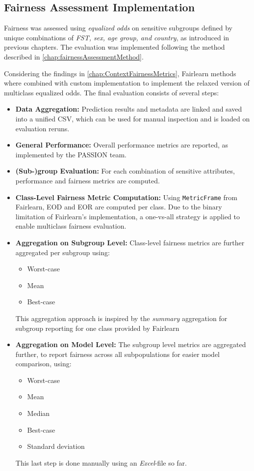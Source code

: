 \documentclass[12pt, a4paper, oneside]{book}   	%
\begin{document}
		
		\subsection{Fairness Assessment Implementation} \label{chap:fairnessAssessmentImpementation}
		Fairness was assessed using \textit{equalized odds} on sensitive subgroups defined by unique combinations of \textit{\gls{FST}, sex, age group, and country}, as introduced in previous chapters. The evaluation was implemented following the method described in \autoref{chap:fairnessAssessmentMethod}.
		
		Considering the findings in \autoref{chap:ContextFairnessMetrics}, \gls{Fairlearn} methods where combined with custom implementation to implement the relaxed version of multiclass equalized odds. The final evaluation consists of several steps:
		\begin{itemize}
			\item \textbf{Data Aggregation:} Prediction results and metadata are linked and saved into a unified CSV, which can be used for manual inspection and is loaded on evaluation reruns.
			\item \textbf{General Performance:} Overall performance metrics are reported, as implemented by the PASSION team.
			\item \textbf{(Sub-)group Evaluation:} For each combination of sensitive attributes, performance and fairness metrics are computed.
			\item \textbf{Class-Level Fairness Metric Computation:} Using \texttt{MetricFrame} from \gls{Fairlearn}, \gls{EOD} and \gls{EOR} are computed per class. Due to the binary limitation of \gls{Fairlearn}'s implementation, a one-vs-all strategy is applied to enable multiclass fairness evaluation.
			\item \textbf{Aggregation on Subgroup Level:} Class-level fairness metrics are further aggregated per subgroup using:
			\begin{itemize}
				\item Worst-case
				\item Mean
				\item Best-case
			\end{itemize}
			This aggregation approach is inspired by the \textit{summary} aggregation for subgroup reporting for one class provided by \gls{Fairlearn} \autocite{Fairlearn_nodate}
			\item \textbf{Aggregation on Model Level:} The subgroup level metrics are aggregated further, to report fairness across all subpopulations for easier model comparison, using:
			\begin{itemize}
				\item Worst-case
				\item Mean
				\item Median
				\item Best-case
				\item Standard deviation
			\end{itemize}
			This last step is done manually using an \textit{Excel}-file so far.
		\end{itemize}
		
\end{document}
